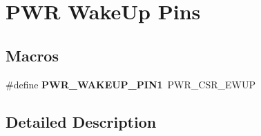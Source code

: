 \hypertarget{group___p_w_r___wake_up___pins}{}\section{P\+WR Wake\+Up Pins}
\label{group___p_w_r___wake_up___pins}
\subsection*{Macros}
\begin{DoxyCompactItemize}
\item 
\mbox{\label{group___p_w_r___wake_up___pins_ga0da8e7cbe0826e93b777ae4419a1cd05}} 
\#define {\bfseries P\+W\+R\+\_\+\+W\+A\+K\+E\+U\+P\+\_\+\+P\+I\+N1}~P\+W\+R\+\_\+\+C\+S\+R\+\_\+\+E\+W\+UP
\end{DoxyCompactItemize}


\subsection{Detailed Description}
